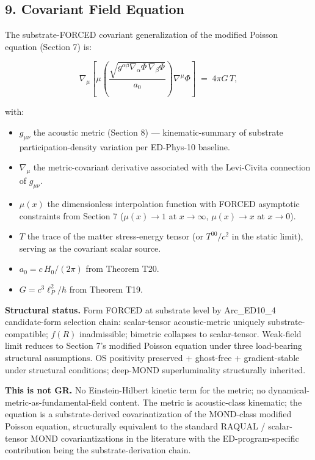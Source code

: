 \documentclass[
  11pt,a4paper]{article}
\providecommand{\tightlist}{%
  \setlength{\itemsep}{0pt}\setlength{\parskip}{0pt}}
\begin{document}
\subsection{9. Covariant Field Equation}\label{covariant-field-equation}

The substrate-FORCED covariant generalization of the modified Poisson
equation (Section 7) is:

\[\boxed{\;\nabla_\mu\!\left[\mu\!\left(\frac{\sqrt{g^{\alpha\beta}\nabla_\alpha\Phi\,\nabla_\beta\Phi}}{a_0}\right)\nabla^\mu\Phi\right] \;=\; 4\pi G\,T,\;}\]

with:

\begin{itemize}
\tightlist
\item
  \(g_{\mu\nu}\) the acoustic metric (Section 8) --- kinematic-summary
  of substrate participation-density variation per ED-Phys-10 baseline.
\item
  \(\nabla_\mu\) the metric-covariant derivative associated with the
  Levi-Civita connection of \(g_{\mu\nu}\).
\item
  \(\mu(x)\) the dimensionless interpolation function with FORCED
  asymptotic constraints from Section 7 (\(\mu(x) \to 1\) at
  \(x \to \infty\), \(\mu(x) \to x\) at \(x \to 0\)).
\item
  \(T\) the trace of the matter stress-energy tensor (or \(T^{00}/c^2\)
  in the static limit), serving as the covariant scalar source.
\item
  \(a_0 = c\,H_0/(2\pi)\) from Theorem T20.
\item
  \(G = c^3\ell_P^2/\hbar\) from Theorem T19.
\end{itemize}

\textbf{Structural status.} Form FORCED at substrate level by
Arc\_ED10\_4 candidate-form selection chain: scalar-tensor
acoustic-metric uniquely substrate-compatible; \(f(R)\) inadmissible;
bimetric collapses to scalar-tensor. Weak-field limit reduces to Section
7's modified Poisson equation under three load-bearing structural
assumptions. OS positivity preserved + ghost-free + gradient-stable
under structural conditions; deep-MOND superluminality structurally
inherited.

\textbf{This is not GR.} No Einstein-Hilbert kinetic term for the
metric; no dynamical-metric-as-fundamental-field content. The metric is
acoustic-class kinematic; the equation is a substrate-derived
covariantization of the MOND-class modified Poisson equation,
structurally equivalent to the standard RAQUAL / scalar-tensor MOND
covariantizations in the literature with the ED-program-specific
contribution being the substrate-derivation chain.
\end{document}
